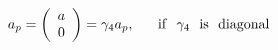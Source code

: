 \begin{equation}
a_{p}= \left(
\begin{array}{c}
a \\  0
\end{array}     \right)= \gamma_{4} a_{p} ,~~~~~{\rm if}~~\gamma_{4}~~{\rm is ~~diagonal}
\end{equation}

